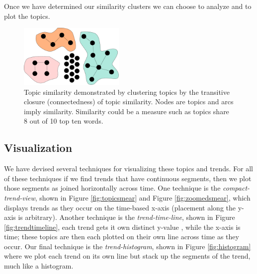 \documentclass[times, 10pt,twocolumn]{article}
\newcommand{\shrinkit}{\vspace*{-.3em}}
\begin{document}
Once we have determined our similarity clusters we can choose to
analyze and to plot the topics.

\begin{figure}
  \centering
  \includegraphics[width=0.45\textwidth]{transitiveclosure}
  \caption{Topic similarity demonstrated by clustering topics by the transitive closure (connectedness)
    of topic similarity. Nodes are topics and
    arcs imply similarity. Similarity could be a measure such as
    topics share 8 out of 10 top ten words.}
\label{fig:closure}
\end{figure}


\shrinkit
\subsection{Visualization}
\shrinkit

We have devised several techniques for visualizing these topics and
trends.  For all of these techniques if we find trends that have
continuous segments, then we plot those segments as joined
horizontally across time. One technique is the \emph{compact-trend-view},
shown in Figure \ref{fig:topicsmear} and Figure \ref{fig:zoomedsmear},
which displays trends as they occur on the time-based x-axis
(placement along the y-axis is arbitrary).  Another technique is
the \emph{trend-time-line}, shown in Figure \ref{fig:trendtimeline},
each trend gets it own distinct y-value , while the x-axis is time;
these topics are then each plotted on their own line across time as
they occur. Our final technique is the \emph{trend-histogram}, shown in Figure
\ref{fig:histogram} where we plot each trend on its own line but stack
up the segments of the trend, much like a histogram.
\end{document}

